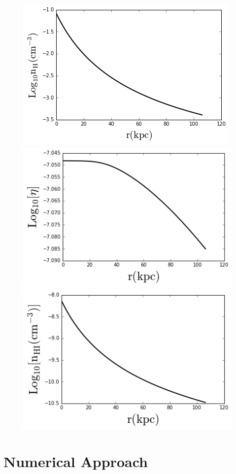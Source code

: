 \documentclass[12pt]{article}
\begin{document}
\begin{figure}[H]
\centering
\includegraphics[scale=0.4]{../code/nhvsr.png}
\includegraphics[scale=0.4]{../code/etavsr.png}
\includegraphics[scale=0.4]{../code/nhivsr.png}
\caption{\label{fig:nhvsr}}
\end{figure}

\section{Numerical Approach}
\end{document}
